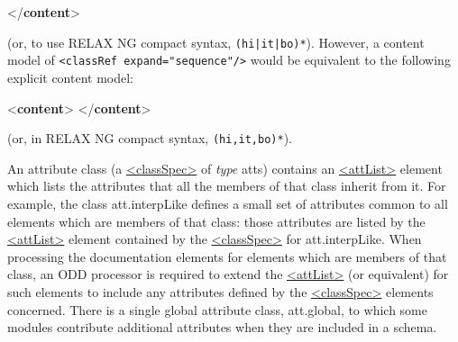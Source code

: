 \begin{shaded}
{</\textbf{content}>}\end{shaded}\egroup\par \noindent  (or, to use RELAX NG compact syntax, \texttt{(hi|it|bo)*}). However, a content model of \texttt{<classRef expand="sequence"/>} would be equivalent to the following explicit content model: \par\bgroup{}\exampleFont \begin{shaded}\noindent\mbox{}{<\textbf{content}>}\mbox{}\newline 
{}\mbox{}\newline 
\hspace*{1em}\mbox{}\newline 
\hspace*{1em}\mbox{}\newline 
\hspace*{1em}\mbox{}\newline 
{}\mbox{}\newline 
{</\textbf{content}>}\end{shaded}\egroup\par \noindent  (or, in RELAX NG compact syntax, \texttt{(hi,it,bo)*}).\par
An attribute class (a \hyperref[TEI.classSpec]{<classSpec>} of {\itshape type} atts) contains an \hyperref[TEI.attList]{<attList>} element which lists the attributes that all the members of that class inherit from it. For example, the class \textsf{att.interpLike} defines a small set of attributes common to all elements which are members of that class: those attributes are listed by the \hyperref[TEI.attList]{<attList>} element contained by the \hyperref[TEI.classSpec]{<classSpec>} for \textsf{att.interpLike}. When processing the documentation elements for elements which are members of that class, an ODD processor is required to extend the \hyperref[TEI.attList]{<attList>} (or equivalent) for such elements to include any attributes defined by the \hyperref[TEI.classSpec]{<classSpec>} elements concerned. There is a single global attribute class, \textsf{att.global}, to which some modules contribute additional attributes when they are included in a schema.
